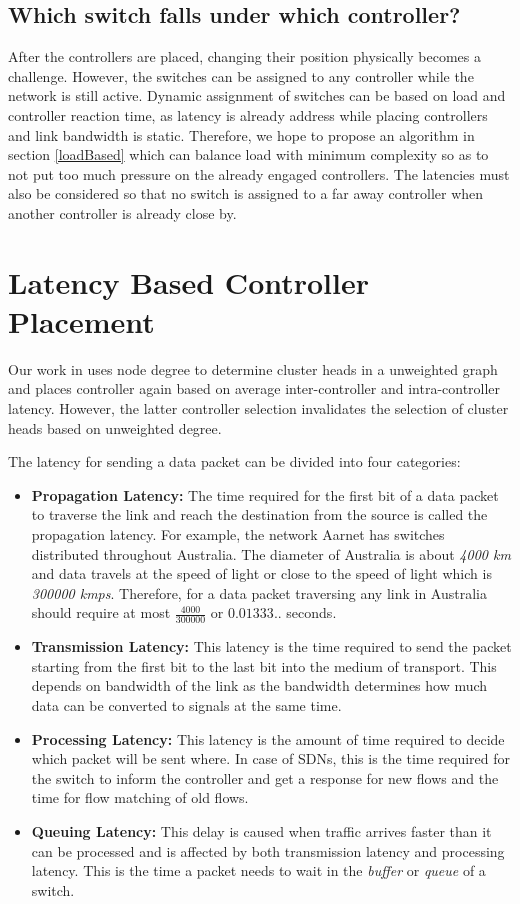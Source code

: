 \documentclass{article}
\begin{document}
	\subsection{Which switch falls under which controller?}
	After the controllers are placed, changing their position physically becomes a challenge. However, the switches can be assigned to any controller while the network is still active. Dynamic assignment of switches can be based on load and controller reaction time, as latency is already address while placing controllers and link bandwidth is static. Therefore, we hope to propose an algorithm in section \ref{loadBased} which can balance load with minimum complexity so as to not put too much pressure on the already engaged controllers. The latencies must also be considered so that no switch is assigned to a far away controller when another controller is already close by.
	
	\section{Latency Based Controller Placement} \label{latencyBased}
	Our work in \cite{aziz2019degree} uses node degree to determine cluster heads in a unweighted graph and places controller again based on average inter-controller and intra-controller latency. However, the latter controller selection invalidates the selection of cluster heads based on unweighted degree.
	
	The latency for sending a data packet can be divided into four categories:
	\begin{itemize}
		\item \textbf{Propagation Latency:} The time required for the first bit of a data packet to traverse the link and reach the destination from the source is called the propagation latency. For example, the network Aarnet has switches distributed throughout Australia. The diameter of Australia is about \textit{4000 km} and data travels at the speed of light or close to the speed of light which is  \textit{300000 kmps}. Therefore, for a data packet traversing any link in Australia should require at most $\frac{4000}{300000}$ or $0.01333..$ seconds.
		\item \textbf{Transmission Latency:} This latency is the time required to send the packet starting from the first bit to the last bit into the medium of transport. This depends on bandwidth of the link as the bandwidth determines how much data can be converted to signals at the same time.
		\item \textbf{Processing Latency:} This latency is the amount of time required to decide which packet will be sent where. In case of SDNs, this is the time required for the switch to inform the controller and get a response for new flows and the time for flow matching of old flows.
		\item \textbf{Queuing Latency:} This delay is caused when traffic arrives faster than it can be processed and is affected by both transmission latency and processing latency. This is the time a packet needs to wait in the \textit{buffer} or \textit{queue} of a switch.
	\end{itemize}
\end{document}

